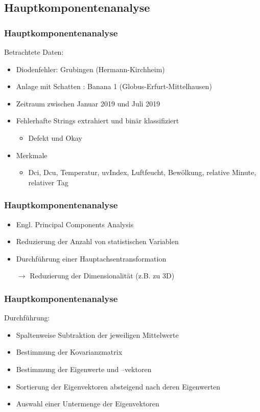 \documentclass[utf8x, xcolor=dvipsnames]{beamer}
\begin{document}
\subsection{Hauptkomponentenanalyse}
\begin{frame}
\frametitle{Hauptkomponentenanalyse}
Betrachtete Daten:
\begin{itemize}
	\item Diodenfehler: Grubingen (Hermann-Kirchheim)
	\item Anlage mit Schatten : Banana 1 (Globus-Erfurt-Mittelhausen)
	\item Zeitraum zwischen Januar 2019 und Juli 2019
	\item Fehlerhafte Strings extrahiert und binär klassifiziert
	\begin{itemize}
		\item Defekt und Okay
	\end{itemize}
	\item Merkmale
	\begin{itemize}
		\item Dci, Dcu, Temperatur, uvIndex, Luftfeucht, Bewölkung, relative Minute, relativer Tag
	\end{itemize}
\end{itemize}
\end{frame}

\begin{frame}
\frametitle{Hauptkomponentenanalyse}
\begin{itemize}
	\item Engl. Principal Components Analysis
	\item Reduzierung der Anzahl von statistischen Variablen
	\item Durchführung einer Hauptachsentransformation
	\item[$\rightarrow$] Reduzierung der Dimensionalität (z.B. zu 3D)
\end{itemize}
\end{frame}

\begin{frame}
\frametitle{Hauptkomponentenanalyse}
Durchführung:
\begin{itemize}
	\item Spaltenweise Subtraktion der jeweiligen Mittelwerte
	\item Bestimmung der Kovarianzmatrix
	\item Bestimmung der Eigenwerte und –vektoren
	\item Sortierung der Eigenvektoren absteigend nach deren Eigenwerten
	\item Auswahl einer Untermenge der Eigenvektoren
\end{itemize}
\end{frame}
\end{document}
